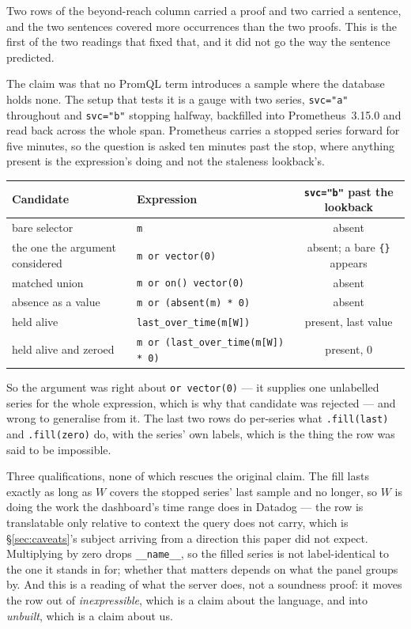 \begin{remark}\label{rem:fill}
Two rows of the beyond-reach column carried a proof and two carried a sentence, and the
two sentences covered more occurrences than the two proofs. This is the first of the two
readings that fixed that, and it did not go the way the sentence predicted.

The claim was that no PromQL term introduces a sample where the database holds none. The
setup that tests it is a gauge with two series, \texttt{svc="a"} throughout and
\texttt{svc="b"} stopping halfway, backfilled into Prometheus~3.15.0 and read back across
the whole span. Prometheus carries a stopped series forward for five minutes, so the
question is asked ten minutes past the stop, where anything present is the expression's
doing and not the staleness lookback's.

\begin{center}\footnotesize
\begin{tabular}{@{}llc@{}}
\toprule
Candidate & Expression & \texttt{svc="b"} past the lookback \\
\midrule
bare selector & \texttt{m} & absent \\
the one the argument considered & \texttt{m or vector(0)} & absent; a bare \texttt{\{\}} appears \\
matched union & \texttt{m or on() vector(0)} & absent \\
absence as a value & \texttt{m or (absent(m) * 0)} & absent \\
held alive & \texttt{last\_over\_time(m[W])} & present, last value \\
held alive and zeroed & \texttt{m or (last\_over\_time(m[W]) * 0)} & present, $0$ \\
\bottomrule
\end{tabular}
\end{center}

\noindent
So the argument was right about \texttt{or vector(0)} --- it supplies one unlabelled
series for the whole expression, which is why that candidate was rejected --- and wrong
to generalise from it. The last two rows do per-series what \texttt{.fill(last)} and
\texttt{.fill(zero)} do, with the series' own labels, which is the thing the row was
said to be impossible.

Three qualifications, none of which rescues the original claim. The fill lasts exactly
as long as $W$ covers the stopped series' last sample and no longer, so $W$ is doing the
work the dashboard's time range does in Datadog --- the row is translatable only
relative to context the query does not carry, which is \S\ref{sec:caveats}'s subject
arriving from a direction this paper did not expect. Multiplying by zero drops
\texttt{\_\_name\_\_}, so the filled series is not label-identical to the one it stands
in for; whether that matters depends on what the panel groups by. And this is a reading
of what the server does, not a soundness proof: it moves the row out of
\emph{inexpressible}, which is a claim about the language, and into \emph{unbuilt},
which is a claim about us.


\end{remark}
